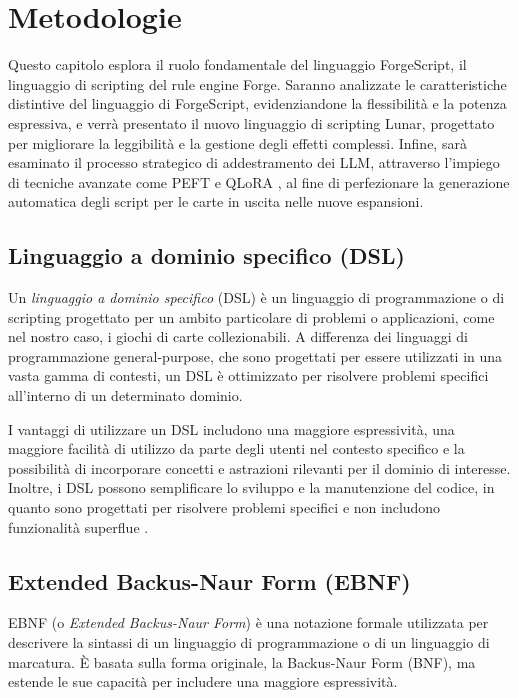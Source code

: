 \chapter{Metodologie}\label{chapter:metodologie}
Questo capitolo esplora il ruolo fondamentale del linguaggio ForgeScript, il linguaggio di scripting del rule engine Forge. Saranno analizzate le caratteristiche distintive del linguaggio di ForgeScript, evidenziandone la flessibilità e la potenza espressiva, e verrà presentato il nuovo linguaggio di scripting Lunar, progettato per migliorare la leggibilità e la gestione degli effetti complessi. Infine, sarà esaminato il processo strategico di addestramento dei LLM, attraverso l'impiego di tecniche avanzate come PEFT \cite{peft} e QLoRA \cite{dettmers2023qlora}, al fine di perfezionare la generazione automatica degli script per le carte in uscita nelle nuove espansioni.


\section{Linguaggio a dominio specifico (DSL)}\label{sec:dsl}
Un \emph{linguaggio a dominio specifico} (DSL) è un linguaggio di programmazione o di scripting progettato per un ambito particolare di problemi o applicazioni, come nel nostro caso, i giochi di carte collezionabili. A differenza dei linguaggi di programmazione general-purpose, che sono progettati per essere utilizzati in una vasta gamma di contesti, un DSL è ottimizzato per risolvere problemi specifici all'interno di un determinato dominio.

I vantaggi di utilizzare un DSL includono una maggiore espressività, una maggiore facilità di utilizzo da parte degli utenti nel contesto specifico e la possibilità di incorporare concetti e astrazioni rilevanti per il dominio di interesse. Inoltre, i DSL possono semplificare lo sviluppo e la manutenzione del codice, in quanto sono progettati per risolvere problemi specifici e non includono funzionalità superflue \cite{fowler-dsl}.

\section{Extended Backus-Naur Form (EBNF)}\label{sec:ebnf}
EBNF (o \textit{Extended Backus-Naur Form}) è una notazione formale utilizzata per descrivere la sintassi di un linguaggio di programmazione o di un linguaggio di marcatura. È basata sulla forma originale, la Backus-Naur Form (BNF), ma estende le sue capacità per includere una maggiore espressività.

